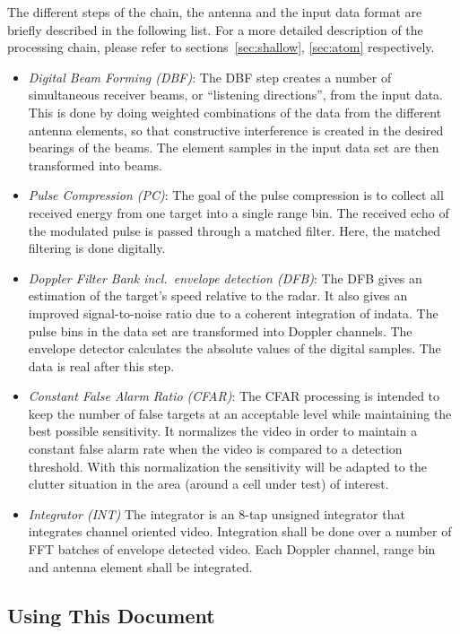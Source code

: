 \documentclass[
  a4paper,
]{article}
\begin{document}
The different steps of the chain, the antenna and the input data format
are briefly described in the following list. For a more detailed
description of the processing chain, please refer to
sections~\ref{sec:shallow}, \ref{sec:atom} respectively.

\begin{itemize}
\item
  \emph{Digital Beam Forming (DBF)}: The DBF step creates a number of
  simultaneous receiver beams, or ``listening directions'', from the
  input data. This is done by doing weighted combinations of the data
  from the different antenna elements, so that constructive interference
  is created in the desired bearings of the beams. The element samples
  in the input data set are then transformed into beams.
\item
  \emph{Pulse Compression (PC)}: The goal of the pulse compression is to
  collect all received energy from one target into a single range bin.
  The received echo of the modulated pulse is passed through a matched
  filter. Here, the matched filtering is done digitally.
\item
  \emph{Doppler Filter Bank incl.~envelope detection (DFB)}: The DFB
  gives an estimation of the target's speed relative to the radar. It
  also gives an improved signal-to-noise ratio due to a coherent
  integration of indata. The pulse bins in the data set are transformed
  into Doppler channels. The envelope detector calculates the absolute
  values of the digital samples. The data is real after this step.
\item
  \emph{Constant False Alarm Ratio (CFAR)}: The CFAR processing is
  intended to keep the number of false targets at an acceptable level
  while maintaining the best possible sensitivity. It normalizes the
  video in order to maintain a constant false alarm rate when the video
  is compared to a detection threshold. With this normalization the
  sensitivity will be adapted to the clutter situation in the area
  (around a cell under test) of interest.
\item
  \emph{Integrator (INT)} The integrator is an 8-tap unsigned integrator
  that integrates channel oriented video. Integration shall be done over
  a number of FFT batches of envelope detected video. Each Doppler
  channel, range bin and antenna element shall be integrated.
\end{itemize}

\hypertarget{sec:usage}{%
\subsection{Using This Document}\label{sec:usage}}
\end{document}
